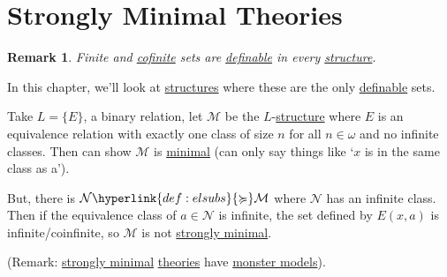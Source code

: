 \documentclass{article}
\newtheorem{nremark}[nthm]{Remark}
\newcommand{\named}[1]{\textbf{#1}\index{#1}}
\newcommand{\M}{\mathcal{M}}
\begin{document}
\clearpage
\section{Strongly Minimal Theories}
\begin{nremark}
  Finite and \hyperlink{def:cofinite}{cofinite} sets are \hyperlink{def:def}{definable} in every \hyperlink{def:str}{structure}.
\end{nremark}
In this chapter, we'll look at \hyperlink{def:str}{structures} where these are the only \hyperlink{def:def}{definable} sets.
\begin{eg}
  Take $L = \{E\}$, a binary relation, let $\mathcal{M}$ be the $L$-\hyperlink{def:str}{structure} where $E$ is an equivalence relation with exactly one class of size $n$ for all $n \in \omega$ and no infinite classes.
  Then can show $\mathcal{M}$ is \hyperlink{def:minimal}{minimal} (can only say things like `$x$ is in the same class as a').

  But, there is $\mathcal{N} \hyperlink{def:elsubs}{\succcurlyeq} \mathcal{M}$ where $\mathcal{N}$ has an infinite class.
  Then if the equivalence class of $a \in \mathcal{N}$ is infinite, the set defined by $E(x,a)$ is infinite/coinfinite, so $\M$ is not \hyperlink{def:minimal}{strongly minimal}.
\end{eg}
(Remark: \hyperlink{def:minimal}{strongly minimal} \hyperlink{def:ltheory}{theories} have \hyperlink{def:monster}{monster models}).
\end{document}
